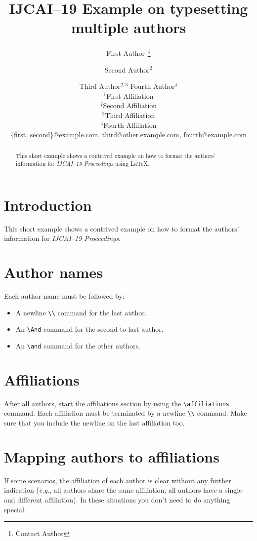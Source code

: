 \documentclass{article}
\title{IJCAI--19 Example on typesetting multiple authors}
\author{
First Author$^1$\footnote{Contact Author}\and
Second Author$^2$\and
Third Author$^{2,3}$\And
Fourth Author$^4$\\
\affiliations
$^1$First Affiliation\\
$^2$Second Affiliation\\
$^3$Third Affiliation\\
$^4$Fourth Affiliation\\
\emails
\{first, second\}@example.com,
third@other.example.com,
fourth@example.com
}
\begin{document}
\maketitle

\begin{abstract}
This short example shows a contrived example on how to format the authors' information for {\it IJCAI--19 Proceedings} using \LaTeX{}.
\end{abstract}

\section{Introduction}

This short example shows a contrived example on how to format the authors' information for {\it IJCAI--19 Proceedings}.

\section{Author names}

Each author name must be followed by:
\begin{itemize}
    \item A newline {\tt \textbackslash{}\textbackslash{}} command for the last author.
    \item An {\tt \textbackslash{}And} command for the second to last author.
    \item An {\tt \textbackslash{}and} command for the other authors.
\end{itemize}

\section{Affiliations}

After all authors, start the affiliations section by using the {\tt \textbackslash{}affiliations} command.
Each affiliation must be terminated by a newline {\tt \textbackslash{}\textbackslash{}} command. Make sure that you include the newline on the last affiliation too.

\section{Mapping authors to affiliations}

If some scenarios, the affiliation of each author is clear without any further indication (\emph{e.g.}, all authors share the same affiliation, all authors have a single and different affiliation). In these situations you don't need to do anything special.
\end{document}
